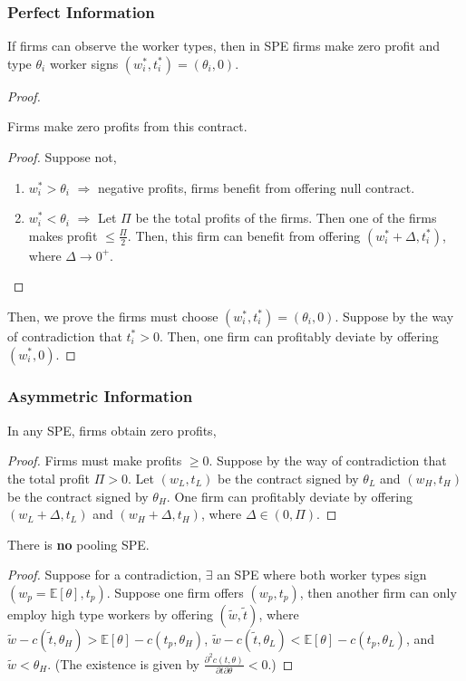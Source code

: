 \documentclass[11pt]{elegantbook}
\begin{document}
\subsubsection*{Perfect Information}
\begin{proposition}
    If firms can observe the worker types, then in SPE firms make zero profit and type $\theta_i$ worker signs $(w^*_i,t^*_i)=(\theta_i,0)$.
\end{proposition}
\begin{proof}
    \begin{claim}
        Firms make zero profits from this contract.
    \end{claim}
    \begin{proof}
        Suppose not,
    \begin{enumerate}[$\circ$]
        \item $w^*_i>\theta_i$ $\Rightarrow$ negative profits, firms benefit from offering null contract.
        \item $w^*_i<\theta_i$ $\Rightarrow$ Let $\Pi$ be the total profits of the firms. Then one of the firms makes profit $\leq \frac{\Pi}{2}$. Then, this firm can benefit from offering $(w^*_i+\Delta,t^*_i)$, where $\Delta \rightarrow 0^+$.
    \end{enumerate}
    \end{proof}
    Then, we prove the firms must choose $(w^*_i,t^*_i)=(\theta_i,0)$. Suppose by the way of contradiction that $t_i^*>0$. Then, one firm can profitably deviate by offering $(w^*_i,0)$.
\end{proof}

\subsubsection*{Asymmetric Information}
\begin{lemma}\label{lemma:zero_profit}
    In any SPE, firms obtain zero profits,
\end{lemma}
\begin{proof}
    Firms must make profits $\geq 0$. Suppose by the way of contradiction that the total profit $\Pi>0$. Let $(w_L,t_L)$ be the contract signed by $\theta_L$ and $(w_H,t_H)$ be the contract signed by $\theta_H$. One firm can profitably deviate by offering $(w_L+\Delta,t_L)$ and $(w_H+\Delta,t_H)$, where $\Delta \in (0,\Pi)$.
\end{proof}

\begin{lemma}
    There is \textbf{no} pooling SPE.
\end{lemma}
\begin{proof}
    Suppose for a contradiction, $\exists$ an SPE where both worker types sign $(w_p=\mathbb{E}[\theta],t_p)$. Suppose one firm offers $(w_p,t_p)$, then another firm can only employ high type workers by offering $(\tilde{w},\tilde{t})$, where $\tilde{w}-c(\tilde{t},\theta_H)>\mathbb{E}[\theta]-c(t_p,\theta_H)$, $\tilde{w}-c(\tilde{t},\theta_L)<\mathbb{E}[\theta]-c(t_p,\theta_L)$, and $\tilde{w}<\theta_H$. (The existence is given by $\frac{\partial^2 c(t,\theta)}{\partial t\partial \theta}<0$.)
\end{proof}
\end{document}

